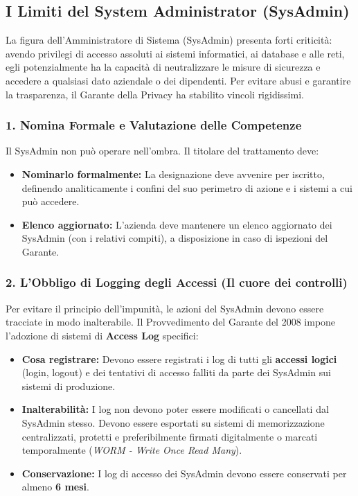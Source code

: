 \subsection{I Limiti del System Administrator (SysAdmin)}

La figura dell'Amministratore di Sistema (SysAdmin) presenta forti criticità: avendo privilegi di accesso assoluti ai sistemi informatici, ai database e alle reti, egli potenzialmente ha la capacità di neutralizzare le misure di sicurezza e accedere a qualsiasi dato aziendale o dei dipendenti.
Per evitare abusi e garantire la trasparenza, il Garante della Privacy ha stabilito vincoli rigidissimi.

\subsubsection*{1. Nomina Formale e Valutazione delle Competenze}
Il SysAdmin non può operare nell'ombra. Il titolare del trattamento deve:
\begin{itemize}
    \item \textbf{Nominarlo formalmente:} La designazione deve avvenire per iscritto, definendo analiticamente i confini del suo perimetro di azione e i sistemi a cui può accedere.
    \item \textbf{Elenco aggiornato:} L'azienda deve mantenere un elenco aggiornato dei SysAdmin (con i relativi compiti), a disposizione in caso di ispezioni del Garante.
\end{itemize}

\subsubsection*{2. L'Obbligo di Logging degli Accessi (Il cuore dei controlli)}
Per evitare il principio dell'impunità, le azioni del SysAdmin devono essere tracciate in modo inalterabile. Il Provvedimento del Garante del 2008 impone l'adozione di sistemi di \textbf{Access Log} specifici:
\begin{itemize}
    \item \textbf{Cosa registrare:} Devono essere registrati i log di tutti gli \textbf{accessi logici} (login, logout) e dei tentativi di accesso falliti da parte dei SysAdmin sui sistemi di produzione.
    \item \textbf{Inalterabilità:} I log non devono poter essere modificati o cancellati dal SysAdmin stesso. Devono essere esportati su sistemi di memorizzazione centralizzati, protetti e preferibilmente firmati digitalmente o marcati temporalmente (\textit{WORM - Write Once Read Many}).
    \item \textbf{Conservazione:} I log di accesso dei SysAdmin devono essere conservati per almeno \textbf{6 mesi}.
\end{itemize}

